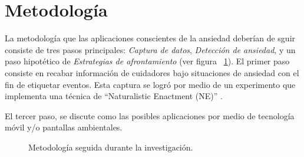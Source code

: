 \section{Metodolog\'ia }\label{secc:methodology}
La metodolog\'ia que las aplicaciones conscientes de la ansiedad deber\'ian de sguir consiste de tres pasos principales: \textit{Captura de datos}, \textit{Detecci\'on de ansiedad}, y un paso hipot\'etico de \textit{Estrategias de afrontamiento} (ver figura ~\ref{fig:metodology}). El primer paso consiste en recabar informaci\'on de cuidadores bajo situaciones de ansiedad con el fin de etiquetar eventos. Esta captura se logr\'o por medio de un experimento que implementa una t\'ecnica de ``Naturalistic Enactment (NE)'' \citep{Castro11}.

El tercer paso, se discute como las posibles aplicaciones por medio de tecnolog\'ia m\'ovil y/o pantallas ambientales.
\begin{figure}[h!]
        \centering
        \caption{Metodolog\'ia seguida durante la investigaci\'on.} \label{fig:metodology}
\end{figure}

